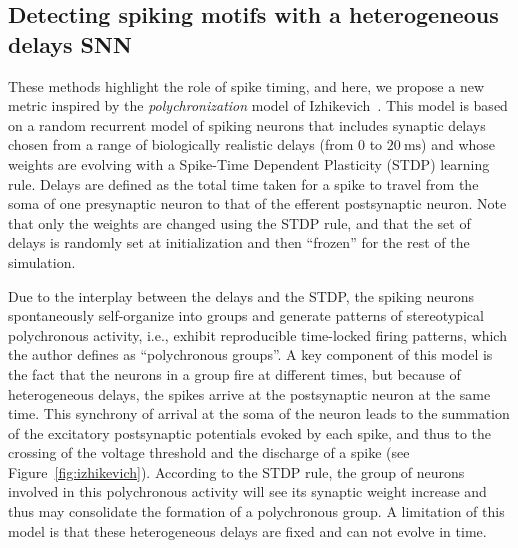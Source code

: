 \documentclass[runningheads]{llncs}
\newcommand{\ms}{\si{\milli\second}}%
\begin{document}
\subsection{Detecting spiking motifs with a heterogeneous delays SNN}
%
These methods highlight the role of spike timing, and here, we propose a new metric inspired by the \textit{polychronization} model of Izhikevich~\cite{izhikevich_polychronization_2006}. This model is based on a random recurrent model of spiking neurons that includes synaptic delays chosen from a range of biologically realistic delays (from $0$ to $20~\ms$) and whose weights are evolving with a Spike-Time Dependent Plasticity (STDP) learning rule. Delays are defined as the total time taken for a spike to travel from the soma of one presynaptic neuron to that of the efferent postsynaptic neuron. Note that only the weights are changed using the STDP rule, and that the set of delays is randomly set at initialization and then ``frozen'' for the rest of the simulation. 

Due to the interplay between the delays and the STDP, the spiking neurons spontaneously self-organize into groups and generate patterns of stereotypical polychronous activity, i.e., exhibit reproducible time-locked firing patterns, which the author defines as ``polychronous groups''. A key component of this model is the fact that the neurons in a group fire at different times, but because of heterogeneous delays, the spikes arrive at the postsynaptic neuron at the same time. This synchrony of arrival at the soma of the neuron leads to the summation of the excitatory postsynaptic potentials evoked by each spike, and thus to the crossing of the voltage threshold and the discharge of a spike (see Figure~\ref{fig:izhikevich}). According to the STDP rule, the group of neurons involved in this polychronous activity will see its synaptic weight increase and thus may consolidate the formation of a polychronous group.  A limitation of this model is that these heterogeneous delays are fixed and can not evolve in time.
\end{document}
